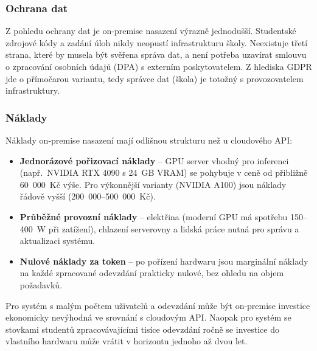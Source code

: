 \subsubsection*{Ochrana dat}
\label{subsubsec:deployment-on-premise-data-protection}

Z pohledu ochrany dat je on-premise nasazení výrazně jednodušší.
Studentské zdrojové kódy a zadání úloh nikdy neopustí infrastrukturu školy.
Neexistuje třetí strana, které by musela být svěřena správa dat, a není potřeba uzavírat smlouvu o zpracování osobních údajů (DPA) s externím poskytovatelem.
Z hlediska GDPR jde o přímočarou variantu, tedy správce dat (škola) je totožný s provozovatelem infrastruktury.

\subsubsection*{Náklady}
\label{subsubsec:deployment-on-premise-costs}

Náklady on-premise nasazení mají odlišnou strukturu než u cloudového API:

\begin{itemize}
    \item \textbf{Jednorázové pořizovací náklady} -- GPU server vhodný pro inferenci (např.~NVIDIA RTX 4090 s 24~GB VRAM) se pohybuje v ceně od přibližně 60~000~Kč výše.
    Pro výkonnější varianty (NVIDIA A100) jsou náklady řádově vyšší (200~000--500~000~Kč).

    \item \textbf{Průběžné provozní náklady} -- elektřina (moderní GPU má spotřebu 150--400~W při zatížení), chlazení serverovny a lidská práce nutná pro správu a aktualizaci systému.

    \item \textbf{Nulové náklady za token} -- po pořízení hardwaru jsou marginální náklady na každé zpracované odevzdání prakticky nulové, bez ohledu na objem požadavků.
\end{itemize}

Pro systém s malým počtem uživatelů a odevzdání může být on-premise investice ekonomicky nevýhodná ve srovnání s cloudovým API\@.
Naopak pro systém se stovkami studentů zpracovávajícími tisíce odevzdání ročně se investice do vlastního hardwaru může vrátit v horizontu jednoho až dvou let.

